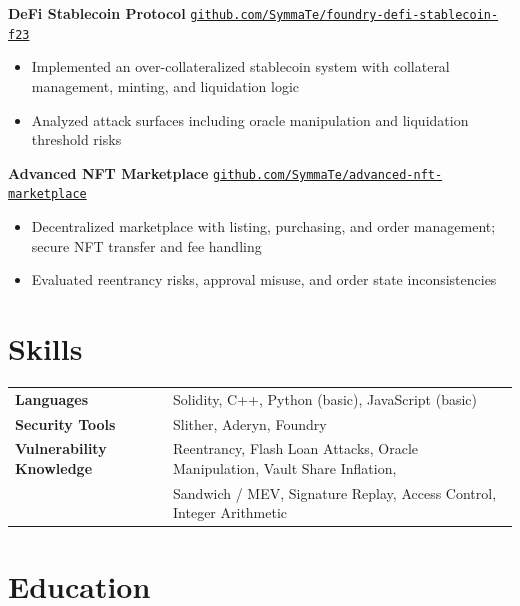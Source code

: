 \documentclass[9pt, a4paper]{article}
\begin{document}
\noindent\textbf{DeFi Stablecoin Protocol} \hfill
\href{https://github.com/SymmaTe/foundry-defi-stablecoin-f23}{\small\texttt{github.com/SymmaTe/foundry-defi-stablecoin-f23}}

\begin{itemize}
  \item Implemented an over-collateralized stablecoin system with collateral management, minting, and liquidation logic
  \item Analyzed attack surfaces including oracle manipulation and liquidation threshold risks
\end{itemize}

\vspace{4pt}
\noindent\textbf{Advanced NFT Marketplace} \hfill
\href{https://github.com/SymmaTe/advanced-nft-marketplace}{\small\texttt{github.com/SymmaTe/advanced-nft-marketplace}}

\begin{itemize}
  \item Decentralized marketplace with listing, purchasing, and order management; secure NFT transfer and fee handling
  \item Evaluated reentrancy risks, approval misuse, and order state inconsistencies
\end{itemize}


\section{Skills}

\begin{tabularx}{\textwidth}{@{} l X @{}}
  \textbf{Languages}       & Solidity, C++, Python (basic), JavaScript (basic) \\[3pt]
  \textbf{Security Tools}  & Slither, Aderyn, Foundry \\[3pt]
  \textbf{Vulnerability Knowledge} & Reentrancy, Flash Loan Attacks, Oracle Manipulation, Vault Share Inflation, \\
                           & Sandwich / MEV, Signature Replay, Access Control, Integer Arithmetic \\
\end{tabularx}


\section{Education}
\end{document}
